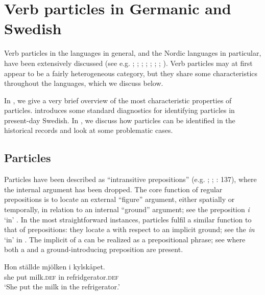\documentclass[output=paper]{langscibook}
\begin{document}
\section{Verb particles in Germanic and Swedish}\label{sec:lalu:2}


Verb particles in the  languages in general, and the Nordic languages in particular, have been extensively discussed (see e.g. \citealt{Afarli1985}; \citealt{Den_dikken1995}; \citealt{Svenonius1996}; \citealt{Wurmbrand2000}; \citealt{Dehe2002}; \citealt{RamchandSvenonius2002}; \citealt{Toivonen2003}; \citealt{Aa2015}). Verb particles may at first appear to be a fairly heterogeneous category, but they share some characteristics throughout the  languages, which we discuss below. 



In , we give a very brief overview of the most characteristic properties of particles.  introduces some standard diagnostics for identifying particles in present-day Swedish. In , we discuss how particles can be identified in the historical records and look at some problematic cases.


\subsection{Particles}\label{sec:lalu:2.1}

\begin{sloppypar}
Particles have been described as “intransitive prepositions” (e.g. \citealt{Emonds1976}; \citealt{Svenonius1996}; \citealt{Faarlund2019}: 137), where the internal argument has been dropped. The core function of regular prepositions is to locate an external “figure” argument, either spatially or temporally, in relation to an internal “ground” argument; see the  preposition \textit{i} ‘in’ . In the most straightforward instances, particles fulfil a similar function to that of prepositions: they locate a  with respect to an implicit ground; see the   \textit{in} ‘in’ in . The implicit  of a  can be realized as a prepositional phrase; see  where both a  and a ground-introducing preposition are present.
\end{sloppypar}

\ea\label{ex:lalu:3}
\ea\label{ex:lalu:3a}
\gll  Hon   ställde   mjölken     i     kylskåpet.\\
    she       put     milk\textsc{.def}   in   refridgerator.\textsc{def}\\
\glt `She put the milk in the refrigerator.'
\end{document}
